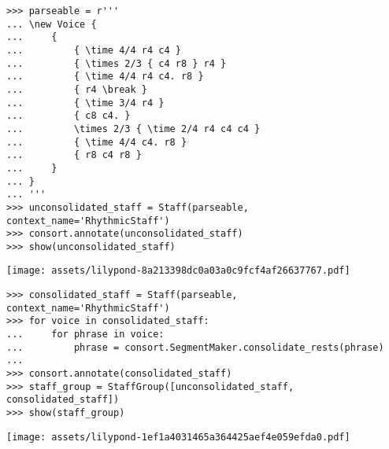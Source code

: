 \begin{comment}
<abjad>
parseable = r'''
\new Voice {
    {
        { \time 4/4 r4 c4 }
        { \times 2/3 { c4 r8 } r4 }
        { \time 4/4 r4 c4. r8 }
        { r4 \break }
        { \time 3/4 r4 }
        { c8 c4. }
        \times 2/3 { \time 2/4 r4 c4 c4 }
        { \time 4/4 c4. r8 }
        { r8 c4 r8 }
    }
}
'''
unconsolidated_staff = Staff(parseable, context_name='RhythmicStaff')
consort.annotate(unconsolidated_staff)
show(unconsolidated_staff)
</abjad>
\end{comment}

\begin{abjadbookoutput}
\begin{singlespacing}
\vspace{-0.5\baselineskip}
\begin{lstlisting}
>>> parseable = r'''
... \new Voice {
...     {
...         { \time 4/4 r4 c4 }
...         { \times 2/3 { c4 r8 } r4 }
...         { \time 4/4 r4 c4. r8 }
...         { r4 \break }
...         { \time 3/4 r4 }
...         { c8 c4. }
...         \times 2/3 { \time 2/4 r4 c4 c4 }
...         { \time 4/4 c4. r8 }
...         { r8 c4 r8 }
...     }
... }
... '''
>>> unconsolidated_staff = Staff(parseable, context_name='RhythmicStaff')
>>> consort.annotate(unconsolidated_staff)
>>> show(unconsolidated_staff)
\end{lstlisting}
\noindent\texttt{[image: assets/lilypond-8a213398dc0a03a0c9fcf4af26637767.pdf]}
\end{singlespacing}
\end{abjadbookoutput}

\begin{comment}
<abjad>
consolidated_staff = Staff(parseable, context_name='RhythmicStaff')
for voice in consolidated_staff:
    for phrase in voice:
        phrase = consort.SegmentMaker.consolidate_rests(phrase)

consort.annotate(consolidated_staff)
staff_group = StaffGroup([unconsolidated_staff, consolidated_staff])
show(staff_group)
</abjad>
\end{comment}

\begin{abjadbookoutput}
\begin{singlespacing}
\vspace{-0.5\baselineskip}
\begin{lstlisting}
>>> consolidated_staff = Staff(parseable, context_name='RhythmicStaff')
>>> for voice in consolidated_staff:
...     for phrase in voice:
...         phrase = consort.SegmentMaker.consolidate_rests(phrase)
...
>>> consort.annotate(consolidated_staff)
>>> staff_group = StaffGroup([unconsolidated_staff, consolidated_staff])
>>> show(staff_group)
\end{lstlisting}
\noindent\texttt{[image: assets/lilypond-1ef1a4031465a364425aef4e059efda0.pdf]}
\end{singlespacing}
\end{abjadbookoutput}


